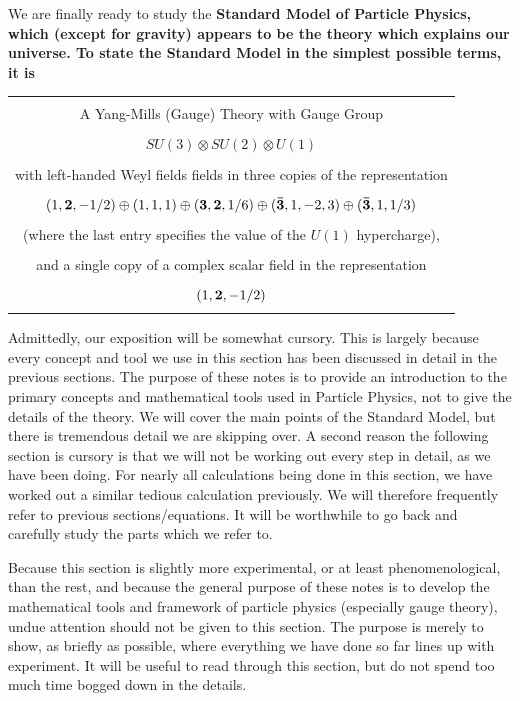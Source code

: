 \documentclass[12pt,epsf]{article}
\begin{document}
We are finally ready to study the \bf Standard Model of Particle
Physics\rm, which (except for gravity) appears to be the theory which
explains our universe.	To state the Standard Model in the simplest
possible terms, it is

\begin{table} [h]
\centering
\begin{tabular}{|c|}
\hline
\; \\
A Yang-Mills (Gauge) Theory with Gauge Group \\ 
\; \\
$SU(3)\otimes SU(2)\otimes U(1)$ \\
\; \\
with left-handed Weyl fields fields in three copies of the
representation \\
\; \\
$(1,\bf 2 \rm, -1/2)\oplus (1,1,1)\oplus (\bf 3\rm,\bf 2\rm,1/6)\oplus
(\bf \bar 3\rm,1,-2,3)\oplus(\bf \bar 3\rm,1,1/3)$ \\
\; \\
(where the last entry specifies the value of the $U(1)$ hypercharge),
\\
\; \\
and a single copy of a complex scalar field in the representation \\
\; \\
$(1,\bf 2\rm,-1/2)$ \\
\; \\
\hline
\end{tabular} \label{smdef}
\end{table}

Admittedly, our exposition will be somewhat cursory.  This is largely
because every concept and tool we use in this section has been
discussed in detail in the previous sections.  The purpose of these
notes is to provide an introduction to the primary concepts and
mathematical tools used in Particle Physics, not to give the details of
the theory.  We will cover the main points of the Standard Model, but
there is tremendous detail we are skipping over.  A second reason the
following section is cursory is that we will not be working out every
step in detail, as we have been doing.	For nearly all calculations
being done in this section, we have worked out a similar tedious
calculation previously.  We will therefore frequently refer to previous
sections/equations.  It will be worthwhile to go back and carefully
study the parts which we refer to.  

Because this section is slightly more experimental, or at least
phenomenological, than the rest, and because the general purpose of
these notes is to develop the mathematical tools and framework of
particle physics (especially gauge theory), undue attention should not
be given to this section.  The purpose is merely to show, as briefly as
possible, where everything we have done so far lines up with
experiment.  It will be useful to read through this section, but do not
spend too much time bogged down in the details.  
\end{document}
